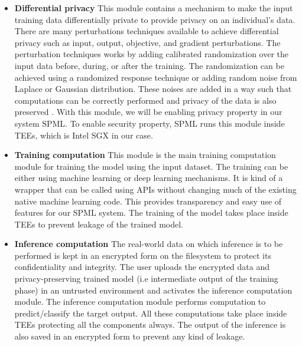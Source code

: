 \begin{itemize}
    \item \textbf{Differential privacy}
This module contains a mechanism to make the input training data differentially private to provide privacy on an individual's data. There are many perturbations techniques available to achieve differential privacy such as input, output, objective, and gradient perturbations. The perturbation techniques works by adding calibrated randomization over the input data before, during, or after the training. The randomization can be achieved using a randomized response technique or adding random noise from Laplace or Gaussian distribution. These noises are added in a way such that computations can be correctly performed and privacy of the data is also preserved \cite{3}. With this module, we will be enabling privacy property in our system SPML. To enable security property, SPML runs this module inside TEEs, which is Intel SGX in our case. 
    \vspace{-0.3cm}\item \textbf{Training computation}
This module is the main training computation module for training the model using the input dataset. The training can be either using machine learning or deep learning mechanisms. It is kind of a wrapper that can be called using APIs without changing much of the existing native machine learning code. This provides transparency and easy use of features for our SPML system. The training of the model takes place inside TEEs to prevent leakage of the trained model.
    \vspace{-0.3cm}\item \textbf{Inference computation}
 The real-world data on which inference is to be performed is kept in an encrypted form on the filesystem to protect its confidentiality and integrity. The user uploads the encrypted data and privacy-preserving trained model (i.e intermediate output of the training phase) in an untrusted environment and activates the inference computation module. The inference computation module performs computation to predict/classify the target output. All these computations take place inside TEEs protecting all the components always. The output of the inference is also saved in an encrypted form to prevent any kind of leakage.
\end{itemize}

